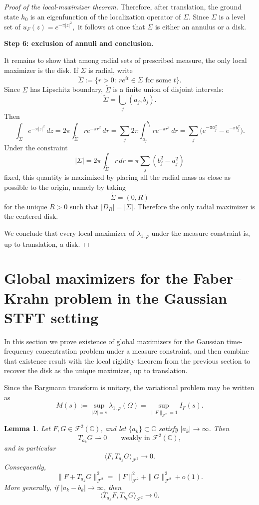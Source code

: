 \documentclass[a4paper,11pt,reqno]{amsart}
\numberwithin{equation}{section}
\theoremstyle{plain} %
\newtheorem{lemma}{Lemma}[section]
\theoremstyle{definition} %
\theoremstyle{remark}
\newcommand{\C}{\mathbb{C}}
\begin{document}
\begin{proof}[Proof of the local-maximizer theorem]
Therefore, after translation, the ground state \(h_0\) is an eigenfunction of the
localization operator of \(\Sigma\). Since \(\Sigma\) is a level set of \(u_F(z) = e^{-\pi |z|^2},\) it follows at once that $\Sigma$ is either an annulus or a disk. 

\medskip
\noindent
{\bf Step 6: exclusion of annuli and conclusion.}

It remains to show that among radial sets of prescribed measure, the only local
maximizer is the disk. If \(\Sigma\) is radial, write
\[
\widetilde \Sigma:=\{r>0:\ re^{it}\in \Sigma \text{ for some } t\}.
\]
Since \(\Sigma\) has Lipschitz boundary, \(\widetilde \Sigma\) is a finite union
of disjoint intervals:
\[
\widetilde \Sigma=\bigcup_j (a_j,b_j).
\]
Then
\[
\int_\Sigma e^{-\pi |z|^2}\,dz
=
2\pi \int_{\widetilde \Sigma} r e^{-\pi r^2}\,dr
=
\sum_j 2\pi \int_{a_j}^{b_j} r e^{-\pi r^2}\,dr
=
\sum_j \big(e^{-\pi a_j^2}-e^{-\pi b_j^2}\big).
\]
Under the constraint
\[
|\Sigma|
=
2\pi \int_{\widetilde \Sigma} r\,dr
=
\pi \sum_j (b_j^2-a_j^2)
\]
fixed, this quantity is maximized by placing all the radial mass as close as
possible to the origin, namely by taking
\[
\widetilde \Sigma=(0,R)
\]
for the unique \(R>0\) such that \(|D_R|=|\Sigma|\). Therefore the only radial
maximizer is the centered disk.

We conclude that every local maximizer of \(\lambda_{1,\varphi}\) under the
measure constraint is, up to translation, a disk.
\end{proof}

\section{Global maximizers for the Faber--Krahn problem in the Gaussian STFT setting}

In this section we prove existence of global maximizers for the Gaussian
time-frequency concentration problem under a measure constraint, and then combine
that existence result with the local rigidity theorem from the previous section
to recover the disk as the unique maximizer, up to translation.


Since the Bargmann transform is unitary, the variational problem may be written as
\[
M(s):=\sup_{|\Omega|=s}\lambda_{1,\varphi}(\Omega)
=
\sup_{\|F\|_{\mathcal F^2}=1} I_F(s).
\]



\begin{lemma}\label{lem:weyl-orthogonality-global}
Let \(F,G\in \mathcal F^2(\C)\), and let \(\{a_k\}\subset \C\) satisfy
\(|a_k|\to \infty\). Then
\[
T_{a_k}G \rightharpoonup 0
\qquad\text{weakly in }\mathcal F^2(\C),
\]
and in particular
\[
\langle F,T_{a_k}G\rangle_{\mathcal F^2}\to 0.
\]
Consequently,
\[
\|F+T_{a_k}G\|_{\mathcal F^2}^2
=
\|F\|_{\mathcal F^2}^2+\|G\|_{\mathcal F^2}^2+o(1).
\]
More generally, if \(|a_k-b_k|\to\infty\), then
\[
\langle T_{a_k}F,T_{b_k}G\rangle_{\mathcal F^2}\to 0.
\]
\end{lemma}
\end{document}
